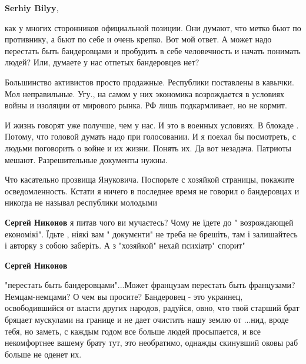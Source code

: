 \begin{itemize}
\begin{itemize}
 
\textbf{Serhiy Bilyy}, 

как у многих сторонников официальной позиции. Они думают, что метко бьют по
противнику, а бьют по себе и очень крепко. Вот мой ответ. А может надо
перестать быть бандеровцами и пробудить в себе человечность и начать понимать
людей? Или, думаете у нас отпетых бандеровцев нет? 

Большинство активистов просто продажные. Республики поставлены в кавычки. Мол
неправильные. Угу., на самом у них экономика возрождается в условиях войны и
изоляции от мирового рынка. РФ лишь подкармливает, но не кормит. 

И жизнь говорят уже получше, чем у нас. И это в военных условиях. В блокаде .
Потому, что головой думать надо при голосовании. И я поехал бы посмотреть, с
людьми поговорить о войне и их жизни.  Понять их. Да вот незадача. Патриоты
мешают. Разрешительные документы нужны.

Что касательно прозвища Януковича. Поспорьте с хозяйкой страницы, покажите
осведомленность. Кстати я ничего в последнее время не говорил о бандеровцах и
никогда не называл республики молодыми

 
\textbf{Сергей Никонов} я питав чого ви мучаєтесь? Чому не їдете до " возрождающей економікі". Їдьте , ніякі вам " докумєнти" не треба не брешіть, там і залишайтесь і авторку з собою заберіть. А з "хозяйкой" нехай психіатр" спорит"

 
\textbf{Сергей Никонов} 

"перестать быть бандеровцами"...Может французам перестать быть
французами? Немцам-немцами? О чем вы просите? Бандеровец - это
украинец, освободившийся от власти других народов, радуйся, овно, что твой старший
брат бряцает мускулами на границе и не дает очистить нашу землю от ...нид, вроде
тебя, но заметь, с каждым годом все больше людей просыпается, и все некомфортнее
вашему брату тут, это необратимо, однажды скинувший оковы раб больше не оденет
их. 


\end{itemize}
\end{itemize}
